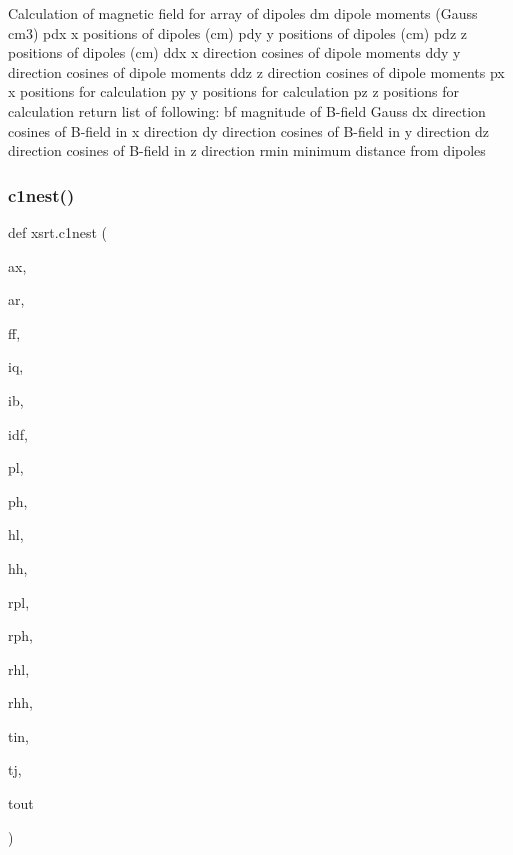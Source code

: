 \begin{DoxyVerb}Calculation of magnetic field for array of dipoles
    dm     dipole moments (Gauss cm3)
    pdx    x positions of dipoles (cm)
    pdy    y positions of dipoles (cm)
    pdz    z positions of dipoles (cm)
    ddx    x direction cosines of dipole moments
    ddy    y direction cosines of dipole moments
    ddz    z direction cosines of dipole moments
    px     x positions for calculation
    py     y positions for calculation
    pz     z positions for calculation 
return list of following:
    bf     magnitude of B-field Gauss
    dx     direction cosines of B-field in x direction
    dy     direction cosines of B-field in y direction
    dz     direction cosines of B-field in z direction
    rmin   minimum distance from dipoles
\end{DoxyVerb}
 \mbox{\label{namespacexsrt_ab404c88c2ec7938d67ae97e3b800401b}} 
\subsubsection{\texorpdfstring{c1nest()}{c1nest()}}
{\footnotesize\ttfamily def xsrt.\+c1nest (\begin{DoxyParamCaption}\item[{}]{ax,  }\item[{}]{ar,  }\item[{}]{ff,  }\item[{}]{iq,  }\item[{}]{ib,  }\item[{}]{idf,  }\item[{}]{pl,  }\item[{}]{ph,  }\item[{}]{hl,  }\item[{}]{hh,  }\item[{}]{rpl,  }\item[{}]{rph,  }\item[{}]{rhl,  }\item[{}]{rhh,  }\item[{}]{tin,  }\item[{}]{tj,  }\item[{}]{tout }\end{DoxyParamCaption})}

